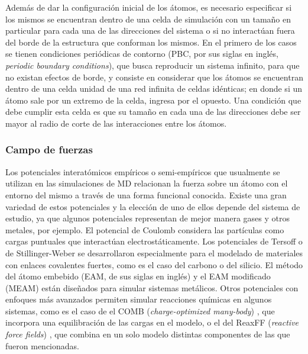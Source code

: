 Además de dar la configuración inicial de los átomos, es necesario especificar si
los mismos se encuentran dentro de una celda de simulación con un tamaño en
particular para cada una de las direcciones del sistema o si no interactúan fuera
del borde de la estructura que conforman los mismos. En el primero de los casos
se tienen condiciones periódicas de contorno (PBC, por sus siglas en inglés, 
\textit{periodic boundary conditions}), que busca reproducir un sistema infinito,
para que no existan efectos de borde, y consiste en considerar que los átomos se 
encuentran dentro de una celda unidad de una red infinita de celdas idénticas; en
donde si un átomo sale por un extremo de la celda, ingresa por el opuesto. Una
condición que debe cumplir esta celda es que su tamaño en cada una de las 
direcciones debe ser mayor al radio de corte de las interacciones entre los 
átomos. %


\subsubsection{Campo de fuerzas}

Los potenciales interatómicos empíricos o semi-empíricos que usualmente se 
utilizan en las simulaciones de MD relacionan la fuerza sobre un átomo con el 
entorno del mismo a través de una forma funcional conocida. Existe una gran 
variedad de estos potenciales y la elección de uno de ellos depende del sistema 
de estudio, ya que algunos potenciales representan de mejor manera gases y otros 
metales, por ejemplo. El potencial de Coulomb \cite{coulomb} considera las 
partículas como cargas puntuales que interactúan electrostáticamente. Los 
potenciales de Tersoff \cite{tersoff} o de Stillinger-Weber 
\cite{stillinger-weber} se desarrollaron especialmente para el modelado de 
materiales con enlaces covalentes fuertes, como es el caso del carbono o del 
silicio. El método del átomo embebido (EAM, de sus siglas en inglés) \cite{eam} 
y el EAM modificado (MEAM) \cite{meam} están diseñados para simular sistemas 
metálicos. Otros potenciales con enfoques más avanzados permiten simular
reacciones químicas en algunos sistemas, como es el caso de el COMB 
(\textit{charge-optimized many-body}) \cite{comb}, que incorpora una 
equilibración de las cargas en el modelo, o el del ReaxFF (\textit{reactive 
force fields}) \cite{reaxff}, que combina en un solo modelo distintas 
componentes de las que fueron mencionadas. 

